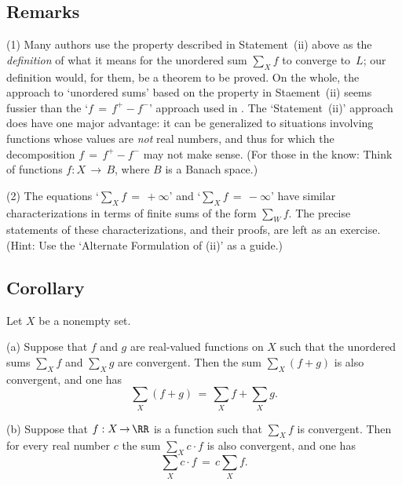 \V
\V

            \subsection{\small{\bf Remarks}}
            \label{RemrkG20.55}

\V

\hspace*{\parindent}(1) Many authors use the property described in Statement~(ii) above as the {\em definition} of what it means for the unordered sum $\sum_{X} f$ to converge to~$L$;
    our definition would, for them, be a theorem to be proved.
    On the whole, the approach to `unordered sums' based on the property in Staement~(ii) seems fussier than the `$f \,=\, f^{+}-f^{-}$' approach used in {\TheseNotes}.
    The `Statement~(ii)' approach does have one major advantage: it can be generalized to situations involving functions whose values are {\em not} real numbers,
    and thus for which the decomposition $f \,=\, f^{+}-f^{-}$ may not make sense.
    (For those in the know: Think of functions $f:X \,{\rightarrow}\, B$, where $B$ is a Banach space.)

\V

        (2) The equations `$\sum_{X} f \,=\, +{\infty}$' and `$\sum_{X} f \,=\, -{\infty}$' have similar characterizations in terms of finite sums of the form $\sum_{W} f$.
    The precise statements of these characterizations, and their proofs, are left as an exercise.
    (Hint: Use the `Alternate Formulation of (ii)' as a guide.)

\V

            \subsection{\small{\bf Corollary}}
            \label{CorG20.60}

        Let $X$  be a nonempty set.

\V

        (a) Suppose that $f$ and $g$ are real-valued functions on $X$ such that the unordered sums ${\sum}_{X} f$ and ${\sum}_{X} g$ are convergent.
    Then the sum ${\sum}_{X} (f+g)$ is also convergent, and one has
        \begin{displaymath}
        {\sum}_{X} (f+g) \,=\, {\sum}_{X} f + {\sum}_{X} g.
        \end{displaymath}

\V

        (b) Suppose that $f:X \,{\rightarrow}\, {\RR}$ is a function such that ${\sum}_{X} f$ is convergent.
    Then for every real number $c$ the sum ${\sum}_{X} c{\cdot}f$ is also convergent, and one has
        \begin{displaymath}
        {\sum}_{X} c{\cdot}f \,=\, c{\sum}_{X} f.
        \end{displaymath}

